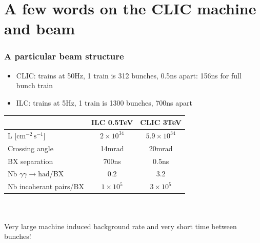 \documentclass{beamer}
\begin{document}
\section[CLIC]{A few words on the CLIC machine and beam} 
\begin{frame}
\frametitle{A particular beam structure}
\begin{itemize}
  \item CLIC: trains at 50Hz, 1 train is 312 bunches, 0.5ns apart: \alert{156ns
  for full bunch train}
  \item ILC: trains at 5Hz, 1 train is 1300 bunches, 700ns apart
\end{itemize}
\centering
\begin{tabular}{lcc}
 & ILC 0.5TeV & CLIC 3TeV\\
 \hline
L [$\textrm{cm}^{-2}\,\textrm{s}^{-1}$] & $2\times 10^{34}$&$5.9\times 10^{34}$ \\
\hline
Crossing angle & 14mrad & 20mrad\\
\hline
BX separation & 700ns & \alert{0.5ns}\\
\hline
Nb $\gamma\gamma\to\textrm{had}$/BX & 0.2 & \alert{3.2}\\
\hline
Nb incoherant pairs/BX & $1\times 10^5$ & \alert{$3\times10^5$}\\
\hline
\end{tabular}
~\\
~\\
\alert{Very large machine induced background rate and very short time between bunches!}
\end{frame}

\end{document}
